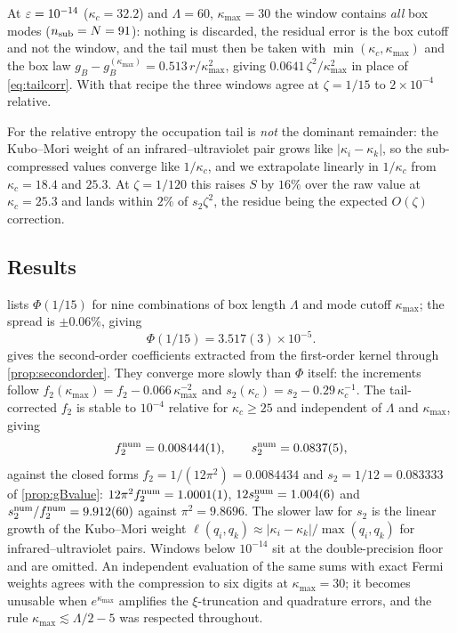 At $\varepsilon=10^{-14}$ ($\kappa_c=32.2$) and $\Lambda=60$, $\kappa_{\max}=30$ the
window contains \emph{all} box modes ($n_{\rm sub}=N=91$): nothing is discarded,
the residual error is the box cutoff and not the window, and the tail must then be
taken with $\min(\kappa_c,\kappa_{\max})$ and the box law
$g_B-g_B^{(\kappa_{\max})}=0.513\,r/\kappa_{\max}^2$, giving $0.0641\,\zeta^2/\kappa_{\max}^2$
in place of \eqref{eq:tailcorr}.  With that recipe the three windows agree at
$\zeta=1/15$ to $2\times10^{-4}$ relative.

For the relative entropy the occupation tail is \emph{not} the dominant
remainder: the Kubo--Mori weight of an infrared--ultraviolet pair grows like
$|\kappa_i-\kappa_k|$, so the sub-compressed values converge like $1/\kappa_c$, and
we extrapolate linearly in $1/\kappa_c$ from $\kappa_c=18.4$ and $25.3$.  At
$\zeta=1/120$ this raises $S$ by $16\%$ over the raw value at $\kappa_c=25.3$ and
lands within $2\%$ of $s_2\zeta^2$, the residue being the expected $O(\zeta)$
correction.

\subsection{Results}
 lists $\Phi(1/15)$ for nine combinations of box length
$\Lambda$ and mode cutoff $\kappa_{\max}$; the spread is $\pm0.06\%$, giving
\begin{equation}\label{eq:Phi115}
 \Phi(1/15)=3.517(3)\times10^{-5}.
\end{equation}
 gives the second-order coefficients extracted from the
first-order kernel through \cref{prop:secondorder}.  They converge more slowly
than $\Phi$ itself: the increments follow
$f_2(\kappa_{\max})=f_2-0.066\,\kappa_{\max}^{-2}$ and
$s_2(\kappa_c)=s_2-0.29\,\kappa_c^{-1}$.  The tail-corrected $f_2$ is stable to
$10^{-4}$ relative for $\kappa_c\ge25$ and independent of $\Lambda$ and
$\kappa_{\max}$, giving
\begin{equation}\label{eq:f2s2}
 f_2^{\rm num}=0.008444(1),\qquad s_2^{\rm num}=0.0837(5),
\end{equation}
against the closed forms $f_2=1/(12\pi^2)=0.0084434$ and $s_2=1/12=0.083333$ of
\cref{prop:gBvalue}: $12\pi^2f_2^{\rm num}=1.0001(1)$, $12s_2^{\rm num}=1.004(6)$
and $s_2^{\rm num}/f_2^{\rm num}=9.912(60)$ against $\pi^2=9.8696$.  The slower
law for $s_2$ is the linear growth of the Kubo--Mori weight
$\ell(q_i,q_k)\approx|\kappa_i-\kappa_k|/\max(q_i,q_k)$ for
infrared--ultraviolet pairs.  Windows below $10^{-14}$ sit at the
double-precision floor and are omitted.  An independent evaluation of the same
sums with exact Fermi weights agrees with the compression to six digits at
$\kappa_{\max}=30$; it becomes unusable when $e^{\kappa_{\max}}$ amplifies the
$\xi$-truncation and quadrature errors, and the rule
$\kappa_{\max}\lesssim\Lambda/2-5$ was respected throughout.

